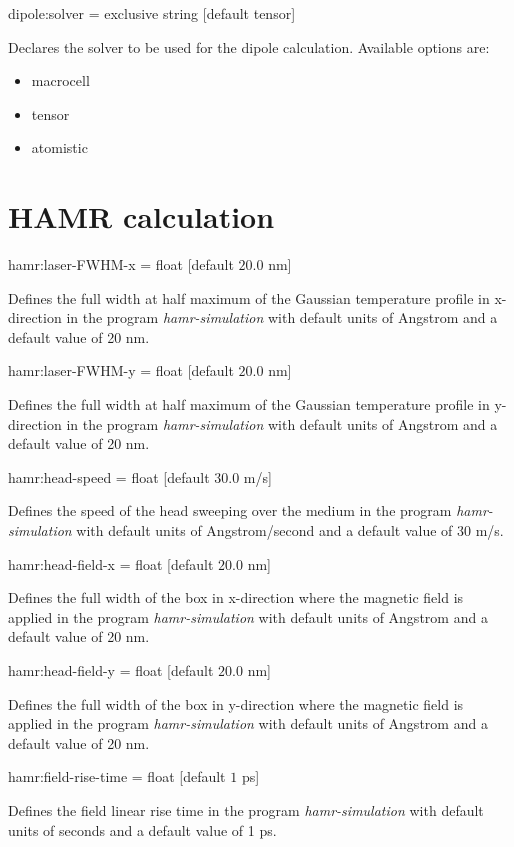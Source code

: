 {\zicf dipole:solver = exclusive string [default tensor]}
Declares the solver to be used for the dipole calculation. Available options are:
\begin{itemize}
  \item[] macrocell
  \item[] tensor
  \item[] atomistic
\end{itemize}

\section*{HAMR calculation}
{\zicf hamr:laser-FWHM-x = float [default $20.0$ nm]}
Defines the full width at half maximum of the Gaussian temperature profile in x-direction
in the program \textit{hamr-simulation} with default units of Angstrom and a default value of 20 nm.

{\zicf hamr:laser-FWHM-y = float [default $20.0$ nm]}
Defines the full width at half maximum of the Gaussian temperature profile in y-direction
in the program \textit{hamr-simulation} with default units of Angstrom and a default value of 20 nm.

{\zicf hamr:head-speed = float [default $30.0$ m/s]}
Defines the speed of the head sweeping over the medium
in the program \textit{hamr-simulation} with default units of Angstrom/second and a default value of 30 m/s.

{\zicf hamr:head-field-x = float [default $20.0$ nm]}
Defines the full width of the box in x-direction where the magnetic field is applied
in the program \textit{hamr-simulation} with default units of Angstrom and a default value of 20 nm.

{\zicf hamr:head-field-y = float [default $20.0$ nm]}
Defines the full width of the box in y-direction where the magnetic field is applied
in the program \textit{hamr-simulation} with default units of Angstrom and a default value of 20 nm.

{\zicf hamr:field-rise-time = float [default $1$ ps]}
Defines the field linear rise time in the program \textit{hamr-simulation} with default units of seconds and a default value of 1 ps.

